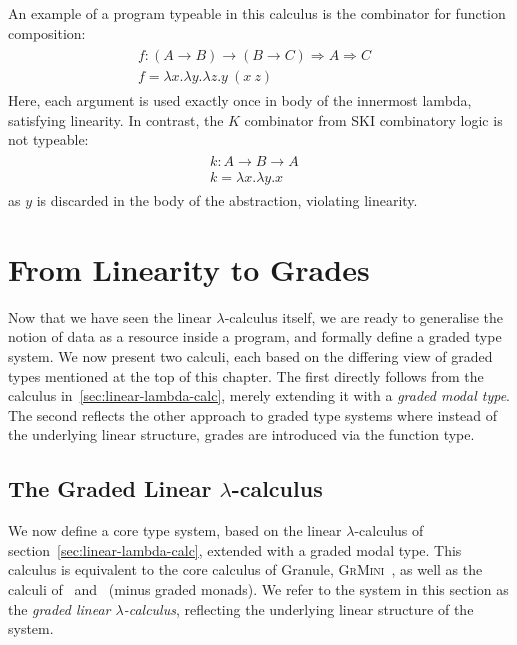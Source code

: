An example of a program typeable in this calculus is the combinator for function
composition: 
\begin{align*}
  \tag{well-typed}
\begin{array}{ll}
    f : (A \rightarrow B) \rightarrow (B \rightarrow C) \Rightarrow A \Rightarrow C &
    \\
    f = \lambda x. \lambda y. \lambda z. y\ (x\ z) &
\end{array}  
\end{align*}
Here, each argument is used exactly once in body of the innermost lambda, satisfying 
linearity. In contrast, the $K$ combinator from SKI combinatory logic is not typeable:
\begin{align*}
  \tag{ill-typed}
\begin{array}{ll}
    k : A \rightarrow B \rightarrow A &
    \\
    k = \lambda x. \lambda y. x &
\end{array}  
\end{align*}
as $y$ is discarded in the body of the abstraction, violating linearity.

\section{From Linearity to Grades}

Now that we have seen the linear $\lambda$-calculus itself, we are ready to
generalise the notion of data as a resource inside a program, and formally
define a graded type system. We now present two calculi, each based on the
differing view of graded types mentioned at the top of this chapter. The first
directly follows from the calculus in~\ref{sec:linear-lambda-calc}, merely
extending it with a \emph{graded modal type}. The second reflects the other
approach to graded type systems where instead of the underlying linear
structure, grades are introduced via the function type. 

\subsection{The Graded Linear $\lambda$-calculus}
\label{sec:linear-base}
We now define a core type system, based on the linear $\lambda$-calculus of
section~\ref{sec:linear-lambda-calc}, extended with a graded modal type. This
calculus is equivalent to the core calculus of Granule,
\textsc{GrMini}~\citep{DBLP:journals/pacmpl/OrchardLE19}, as well as the calculi
of~\citet{brunel2014core} and~\citet{DBLP:conf/icfp/GaboardiKOBU16} (minus
graded monads). We refer to the system in this section as the \textit{graded
linear $\lambda$-calculus}, reflecting the underlying linear structure of the
system.

